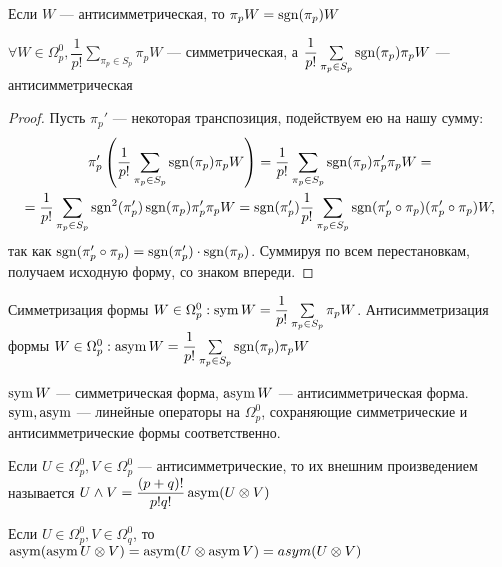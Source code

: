 \begin{prop}
	Если $W$ --- антисимметрическая, то $\pi_pW=\operatorname{sgn}(\pi_p)W$
\end{prop}

\begin{prop}
	$\forall W\in \Omega_p^0, \dfrac{1}{p!}\sum\limits_{\pi_p\in S_p}\pi_pW$ --- симметрическая, а $\dfrac{1}{p!}\sum\limits_{\pi_p\in S_p}\sgn(\pi_p)\pi_pW$ --- антисимметрическая
\end{prop}

\begin{proof}
	Пусть $\pi_p'$ --- некоторая транспозиция, подействуем ею на нашу сумму: 
	\begin{multline*}\pi_p'\left(\dfrac{1}{p!}\sum\limits_{\pi_p\in S_p}\sgn(\pi_p)\pi_pW\right)=\dfrac{1}{p!}\sum\limits_{\pi_p\in S_p}\sgn(\pi_p)\pi'_p\pi_pW = \\ =
	\dfrac{1}{p!}\sum\limits_{\pi_p\in S_p}\sgn^2(\pi'_p)\sgn(\pi_p)\pi'_p\pi_pW = \sgn(\pi'_p)\dfrac{1}{p!}\sum\limits_{\pi_p\in S_p}\sgn(\pi'_p\circ\pi_p)(\pi'_p\circ\pi_p)W, 
\end{multline*}
	так как $\operatorname{sgn}(\pi'_p\circ\pi_p)=\operatorname{sgn}(\pi'_p)\cdot\operatorname{sgn}(\pi_p)$. Суммируя по всем перестановкам, получаем исходную форму, со знаком впереди.
\end{proof}

\begin{Def}
	Симметризация формы $W\in\Omega_p^0: \sym W =\dfrac{1}{p!}\sum\limits_{\pi_p\in S_p}\pi_pW$. Антисимметризация формы $W\in\Omega_p^0: \asym W =\dfrac{1}{p!}\sum\limits_{\pi_p\in S_p}\sgn(\pi_p)\pi_pW$
\end{Def}

\begin{prop}
	$\operatorname{sym} W$ --- симметрическая форма, $\operatorname{asym} W$ --- антисимметрическая форма. $\operatorname{sym} , \operatorname{asym} $ --- линейные операторы на $\Omega_p^0$, сохраняющие симметрические и антисимметрические формы соответственно.
\end{prop}

\begin{Def}
	Если $U\in\Omega_p^0, V\in\Omega_p^0$ --- антисимметрические, то их внешним произведением называется $U\wedge V = \dfrac{(p+q)!}{p!q!}\operatorname{asym}(U\otimes V)$
\end{Def}


\begin{lemma}
	Если $U\in \Omega_p^0, V\in\Omega_q^0$, то $\operatorname{asym}(\operatorname{asym} U\otimes V)=\operatorname{asym}(U \otimes \operatorname{asym} V)=asym(U\otimes V)$
\end{lemma}

